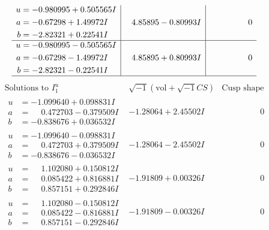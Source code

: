 \documentclass[1p]{elsarticle_modified}
\theoremstyle{definition}
\newcommand{\I}{\sqrt{-1}}
\begin{document}
$$\begin{array}{c|c|c}
\begin{aligned}
u &= -0.980995 + 0.505565 I \\
a &= -0.67298 + 1.49972 I \\
b &= -2.82321 + 0.22541 I\end{aligned}
 & \phantom{-}4.85895 - 0.80993 I & \phantom{-0.000000 } 0 \\ \hline\begin{aligned}
u &= -0.980995 - 0.505565 I \\
a &= -0.67298 - 1.49972 I \\
b &= -2.82321 - 0.22541 I\end{aligned}
 & \phantom{-}4.85895 + 0.80993 I & \phantom{-0.000000 } 0\\
 \hline 
 \end{array}$$\newpage$$\begin{array}{c|c|c}  
\text{Solutions to }I^u_{1}& \I (\text{vol} + \sqrt{-1}CS) & \text{Cusp shape}\\
 \hline 
\begin{aligned}
u &= -1.099640 + 0.098831 I \\
a &= \phantom{-}0.472703 - 0.379509 I \\
b &= -0.838676 + 0.036532 I\end{aligned}
 & -1.28064 + 2.45502 I & \phantom{-0.000000 } 0 \\ \hline\begin{aligned}
u &= -1.099640 - 0.098831 I \\
a &= \phantom{-}0.472703 + 0.379509 I \\
b &= -0.838676 - 0.036532 I\end{aligned}
 & -1.28064 - 2.45502 I & \phantom{-0.000000 } 0 \\ \hline\begin{aligned}
u &= \phantom{-}1.102080 + 0.150812 I \\
a &= \phantom{-}0.085422 + 0.816881 I \\
b &= \phantom{-}0.857151 + 0.292846 I\end{aligned}
 & -1.91809 + 0.00326 I & \phantom{-0.000000 } 0 \\ \hline\begin{aligned}
u &= \phantom{-}1.102080 - 0.150812 I \\
a &= \phantom{-}0.085422 - 0.816881 I \\
b &= \phantom{-}0.857151 - 0.292846 I\end{aligned}
 & -1.91809 - 0.00326 I & \phantom{-0.000000 } 0 \\ \hline\begin{aligned}

\end{aligned}
\end{array}$$
\end{document}
